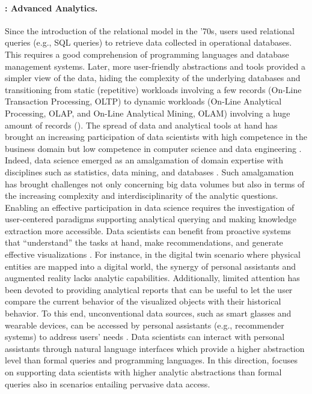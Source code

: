 \paragraph{: Advanced Analytics.}
Since the introduction of the relational model in the '70s, users used relational queries (e.g., SQL queries) to retrieve data collected in operational databases. This requires a good comprehension of programming languages and database management systems. Later, more user-friendly abstractions and tools provided a simpler view of the data, hiding the complexity of the underlying databases \cite{DBLP:journals/is/VassiliadisMR19} and transitioning from static (repetitive) workloads involving a few records (On-Line Transaction Processing, OLTP) to dynamic workloads (On-Line Analytical Processing, OLAP, and On-Line Analytical Mining, OLAM) involving a huge amount of records (). The spread of data and analytical tools at hand has brought an increasing participation of data scientists with high competence in the business domain but low competence in computer science and data engineering \cite{DBLP:journals/is/VassiliadisMR19}. Indeed, data science emerged as an amalgamation of domain expertise with disciplines such as statistics, data mining, and databases \cite{vanderAalst2016}. Such amalgamation has brought challenges not only concerning big data volumes but also in terms of the increasing complexity and interdisciplinarity of the analytic questions. Enabling an effective participation in data science requires the investigation of user-centered paradigms supporting analytical querying and making knowledge extraction more accessible. Data scientists can benefit from proactive systems that ``understand'' the tasks at hand, make recommendations, and generate effective visualizations \cite{DBLP:journals/cacm/GilPBBBBCEGHHHK19}. For instance, in the digital twin scenario \cite{tao2018digital} where physical entities are mapped into a digital world, the synergy of personal assistants and augmented reality lacks analytic capabilities. Additionally, limited attention has been devoted to providing analytical reports that can be useful to let the user compare the current behavior of the visualized objects with their historical behavior. To this end, unconventional data sources, such as smart glasses and wearable devices, can be accessed by personal assistants (e.g., recommender systems) to address users' needs \cite{DBLP:conf/ictir/BahrainianC17}. Data scientists can interact with personal assistants through natural language interfaces which provide a higher abstraction level than formal queries and programming languages. In this direction,  focuses on supporting data scientists with higher analytic abstractions than formal queries also in scenarios entailing pervasive data access. 